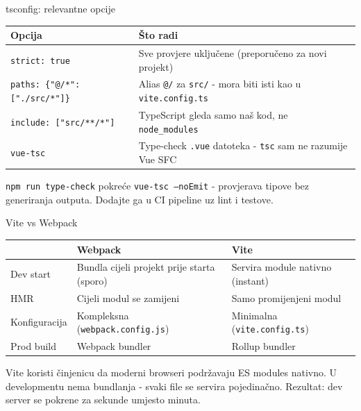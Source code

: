 \begin{frame}{tsconfig: relevantne opcije}
\begin{tabular}{@{}lp{8cm}@{}}
  \toprule
  \textbf{Opcija} & \textbf{Što radi} \\
  \midrule
  \texttt{strict: true} & Sve provjere uključene (preporučeno za novi projekt) \\
  \texttt{paths: \{"@/*": ["./src/*"]\}} & Alias \texttt{@/} za \texttt{src/} - mora biti isti kao u \texttt{vite.config.ts} \\
  \texttt{include: ["src/**/*"]} & TypeScript gleda samo naš kod, ne \texttt{node\_modules} \\
  \texttt{vue-tsc} & Type-check \texttt{.vue} datoteka - \texttt{tsc} sam ne razumije Vue SFC \\
  \bottomrule
\end{tabular}

\vspace{0.6em}
\texttt{npm run type-check} pokreće \texttt{vue-tsc --noEmit} - provjerava tipove bez generiranja outputa. Dodajte ga u CI pipeline uz lint i testove.
\end{frame}

\begin{frame}{Vite vs Webpack}
\begin{tabular}{@{}lp{5cm}p{5cm}@{}}
  \toprule
  & \textbf{Webpack} & \textbf{Vite} \\
  \midrule
  Dev start & Bundla cijeli projekt prije starta (sporo) & Servira module nativno (instant) \\
  HMR & Cijeli modul se zamijeni & Samo promijenjeni modul \\
  Konfiguracija & Kompleksna (\texttt{webpack.config.js}) & Minimalna (\texttt{vite.config.ts}) \\
  Prod build & Webpack bundler & Rollup bundler \\
  \bottomrule
\end{tabular}

\vspace{0.6em}
Vite koristi činjenicu da moderni browseri podržavaju ES modules nativno. U developmentu nema bundlanja - svaki file se servira pojedinačno. Rezultat: dev server se pokrene za sekunde umjesto minuta.
\end{frame}


